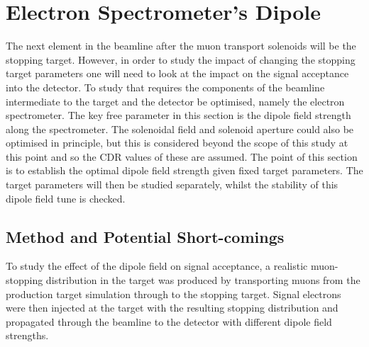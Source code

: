 \section{Electron Spectrometer's Dipole}
The next element in the beamline after the muon transport solenoids will be the stopping target.
However, in order to study the impact of changing the stopping target parameters one will need to look at the impact on the signal acceptance into the detector.
To study that requires the components of the beamline intermediate to the target and the detector be optimised, namely the electron spectrometer.
The key free parameter in this section is the dipole field strength along the spectrometer.
The solenoidal field and solenoid aperture could also be optimised in principle, but this is considered beyond the scope of this study at this point and so the CDR values of these are assumed.
The point of this section is to establish the optimal dipole field strength given fixed target parameters.
The target parameters will then be studied separately, whilst the stability of this dipole field tune is checked.

\subsection{Method and Potential Short-comings}
To study the effect of the dipole field on signal acceptance, a realistic muon-stopping distribution in the target was produced by transporting muons from the production target simulation through to the stopping target.
Signal electrons were then injected at the target with the resulting stopping distribution and propagated through the beamline to the detector with different dipole field strengths.


